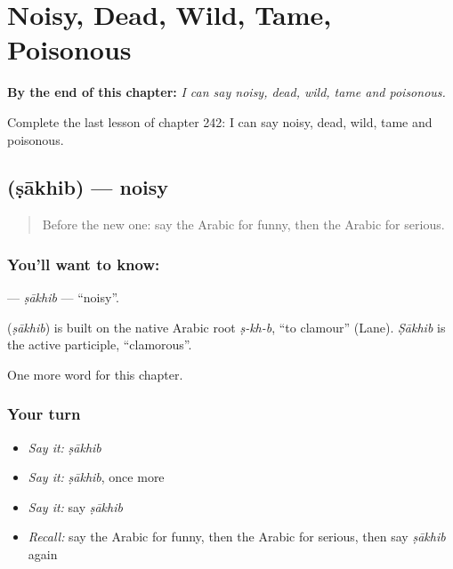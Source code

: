 
\chapter{Noisy, Dead, Wild, Tame, Poisonous}
\label{ch:ar-noisy-dead-wild-tame-poisonous}

\begin{chapteropening}
\textbf{By the end of this chapter:} \emph{I can say noisy, dead, wild, tame and poisonous.}

Complete the last lesson of chapter 242: I can say noisy, dead, wild, tame and poisonous.
\end{chapteropening}

\section[\texorpdfstring{\ar{صاخب} (ṣākhib)}{صاخب (ṣākhib)}]{ (ṣākhib) — noisy}

\label{lesson:AR-C242-sakhib}



\begin{quote}
Before the new one: say the Arabic for funny, then the Arabic for serious.
\end{quote}

\subsection*{You'll want to know: }
\textbf{} — \emph{ṣākhib} — \textquotedblleft{}noisy\textquotedblright{}.

\begin{cousinweb}
\textbf{} (\emph{ṣākhib}) is built on the native Arabic root \emph{ṣ-kh-b}, \textquotedblleft{}to clamour\textquotedblright{} (Lane). \emph{Ṣākhib} is the active participle, \textquotedblleft{}clamorous\textquotedblright{}.
\end{cousinweb}

\begin{grammarlens}[title={What you've built}]
One more word for this chapter.
\end{grammarlens}

\subsection*{Your turn}
\begin{itemize}
\raggedright
  \item \emph{Say it:} \emph{ṣākhib}
  \item \emph{Say it:} \emph{ṣākhib}, once more
  \item \emph{Say it:} say \emph{ṣākhib}
  \item \emph{Recall:} say the Arabic for funny, then the Arabic for serious, then say \emph{ṣākhib} again
\end{itemize}

